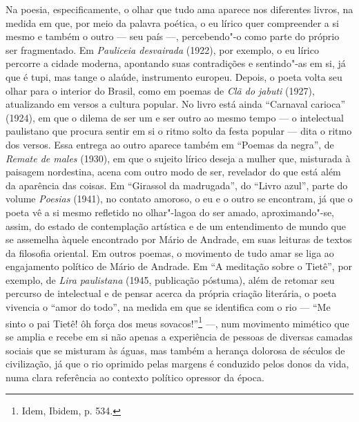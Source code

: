 Na poesia, especificamente, o olhar que tudo ama aparece nos diferentes
livros, na medida em que, por meio da palavra poética, o eu lírico quer
compreender a si mesmo e também o outro --- seu país ---, percebendo"-o
como parte do próprio ser fragmentado. Em \emph{Pauliceia desvairada}
(1922), por exemplo, o eu lírico percorre a cidade moderna, apontando
suas contradições e sentindo"-as em si, já que é tupi, mas tange o
alaúde, instrumento europeu. Depois, o poeta volta seu olhar para o
interior do Brasil, como em poemas de \emph{Clã do jabuti} (1927),
atualizando em versos a cultura popular. No livro está ainda ``Carnaval
carioca'' (1924), em que o dilema de ser um e ser outro ao mesmo tempo
--- o intelectual paulistano que procura sentir em si o ritmo solto da
festa popular --- dita o ritmo dos versos. Essa entrega ao outro aparece
também em ``Poemas da negra'', de \emph{Remate de males} (1930),
em que o sujeito lírico deseja a mulher que, misturada à paisagem
nordestina, acena com outro modo de ser, revelador do que está além da
aparência das coisas. Em ``Girassol da madrugada'', do ``Livro azul'',
parte do volume \emph{Poesias} (1941), no contato amoroso, o eu e o
outro se encontram, já que o poeta vê a si mesmo refletido no
olhar"-lagoa do ser amado, aproximando"-se, assim, do estado de
contemplação artística e de um entendimento de mundo que se assemelha
àquele encontrado por Mário de Andrade, em suas leituras de textos da
filosofia oriental. Em outros poemas, o movimento de tudo amar se liga
ao engajamento político de Mário de Andrade. Em ``A meditação sobre o
Tietê'', por exemplo, de \emph{Lira paulistana} (1945, publicação
póstuma), além de retomar seu percurso de intelectual e de pensar acerca
da própria criação literária, o poeta vivencia o ``amor do todo'', na
medida em que se identifica com o rio --- ``Me sinto o pai Tietê! ôh
força dos meus sovacos!''\footnote{Idem, Ibidem, p. 534.} ---, num
movimento mimético que se amplia e recebe em si não apenas a experiência
de pessoas de diversas camadas sociais que se misturam às águas, mas
também a herança dolorosa de séculos de civilização, já que o rio
oprimido pelas margens é conduzido pelos donos da vida, numa clara
referência ao contexto político opressor da época.

